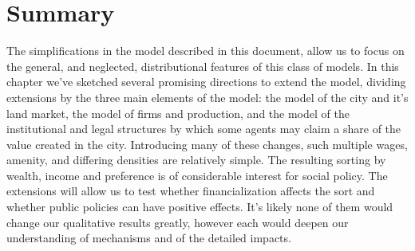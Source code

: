 \section{Summary}


The simplifications in the model described in this document, 
allow us to focus on the general, and neglected, distributional features of this class of models. In this chapter we've sketched several promising directions to extend the model, 
dividing extensions by the three main elements of the model: the model of the city and it's land market, the model of firms and production, and the model of the institutional and legal structures by which some agents may claim a share of the value created in the city. %
Introducing many of these changes, such multiple wages, amenity, and differing densities are relatively simple. The resulting sorting by wealth, income and preference is of considerable interest for social policy. The extensions will allow us to test whether financialization affects the sort and whether public policies can have positive effects. It's likely none of them would change our qualitative results greatly, however each would deepen our understanding of mechanisms and of the detailed impacts. 







